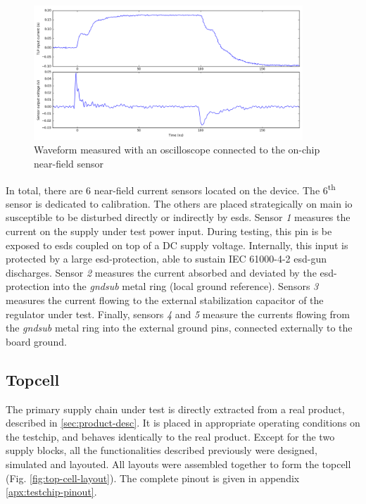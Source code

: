 \begin{figure}[!h]
  \centering
  \includegraphics[width=0.9\textwidth]{src/3/figures/measured_waveform.png}
  \caption{Waveform measured with an oscilloscope connected to the on-chip near-field sensor}
  \label{fig:nfs-wvf}
\end{figure}

In total, there are 6 near-field current sensors located on the device.
The 6\textsuperscript{th} sensor is dedicated to calibration.
The others are placed strategically on main \gls{io} susceptible to be disturbed directly or indirectly by \gls{esd}s.
Sensor \textit{1} measures the current on the supply under test power input.
During testing, this pin is be exposed to \gls{esd}s coupled on top of a DC supply voltage.
Internally, this input is protected by a large \gls{esd-protection}, able to sustain IEC 61000-4-2 \gls{esd-gun} discharges.
Sensor \textit{2} measures the current absorbed and deviated by the \gls{esd-protection} into the \textit{gndsub} metal ring (local ground reference).
Sensors \textit{3} measures the current flowing to the external stabilization capacitor of the regulator under test.
Finally, sensors \textit{4} and \textit{5} measure the currents flowing from the \textit{gndsub} metal ring into the external ground pins, connected externally to the board ground.

\subsection{Topcell}

%
The primary supply chain under test is directly extracted from a real product, described in \ref{sec:product-desc}.
It is placed in appropriate operating conditions on the testchip, and behaves identically to the real product.
Except for the two supply blocks, all the functionalities described previously were designed, simulated and layouted.
All layouts were assembled together to form the topcell (Fig. \ref{fig:top-cell-layout}).
The complete pinout is given in appendix \ref{apx:testchip-pinout}.

